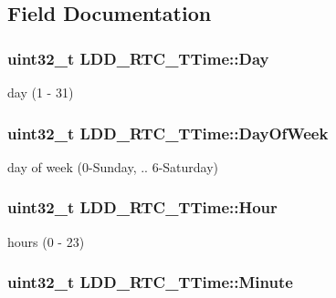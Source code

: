 \subsection{Field Documentation}
\hypertarget{struct_l_d_d___r_t_c___t_time_acc1084e0fd686c588a2947c2f109634f}{
\subsubsection[{Day}]{\setlength{\rightskip}{0pt plus 5cm}uint32\-\_\-t L\-D\-D\-\_\-\-R\-T\-C\-\_\-\-T\-Time\-::\-Day}}\label{struct_l_d_d___r_t_c___t_time_acc1084e0fd686c588a2947c2f109634f}
day (1 -\/ 31) \hypertarget{struct_l_d_d___r_t_c___t_time_a43ba06409c4d35f48d732cb61ff5aed0}{
\subsubsection[{Day\-Of\-Week}]{\setlength{\rightskip}{0pt plus 5cm}uint32\-\_\-t L\-D\-D\-\_\-\-R\-T\-C\-\_\-\-T\-Time\-::\-Day\-Of\-Week}}\label{struct_l_d_d___r_t_c___t_time_a43ba06409c4d35f48d732cb61ff5aed0}
day of week (0-\/\-Sunday, .. 6-\/\-Saturday) \hypertarget{struct_l_d_d___r_t_c___t_time_ade2d4bed82069483da14cfe2ede6fef9}{
\subsubsection[{Hour}]{\setlength{\rightskip}{0pt plus 5cm}uint32\-\_\-t L\-D\-D\-\_\-\-R\-T\-C\-\_\-\-T\-Time\-::\-Hour}}\label{struct_l_d_d___r_t_c___t_time_ade2d4bed82069483da14cfe2ede6fef9}
hours (0 -\/ 23) \hypertarget{struct_l_d_d___r_t_c___t_time_a5cd7a1478dd5dd319fb5837bfbf5459f}{
\subsubsection[{Minute}]{\setlength{\rightskip}{0pt plus 5cm}uint32\-\_\-t L\-D\-D\-\_\-\-R\-T\-C\-\_\-\-T\-Time\-::\-Minute}}\label{struct_l_d_d___r_t_c___t_time_a5cd7a1478dd5dd319fb5837bfbf5459f}
